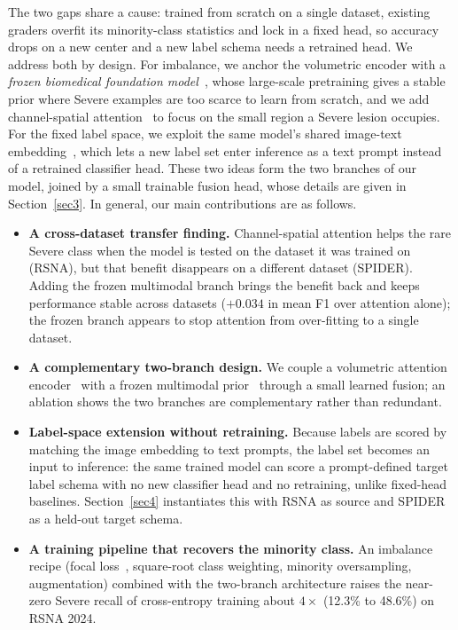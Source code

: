 \documentclass[runningheads]{llncs}
\begin{document}
The two gaps share a cause: trained from scratch on a single dataset, existing graders overfit its minority-class statistics and lock in a fixed head, so accuracy drops on a new center and a new label schema needs a retrained head. We address both by design. For imbalance, we anchor the volumetric encoder with a \emph{frozen biomedical foundation model}~\cite{zhang2023biomedclip}, whose large-scale pretraining gives a stable prior where Severe examples are too scarce to learn from scratch, and we add channel-spatial attention~\cite{woo2018cbam} to focus on the small region a Severe lesion occupies. For the fixed label space, we exploit the same model's shared image-text embedding~\cite{radford2021clip}, which lets a new label set enter inference as a text prompt instead of a retrained classifier head. These two ideas form the two branches of our model, joined by a small trainable fusion head, whose details are given in Section~\ref{sec3}. In general, our main contributions are as follows.
\begin{itemize}
    \item \textbf{A cross-dataset transfer finding.} Channel-spatial attention helps the rare Severe class when the model is tested on the dataset it was trained on (RSNA), but that benefit disappears on a different dataset (SPIDER). Adding the frozen multimodal branch brings the benefit back and keeps performance stable across datasets ($+0.034$ in mean F1 over attention alone); the frozen branch appears to stop attention from over-fitting to a single dataset.
    \item \textbf{A complementary two-branch design.} We couple a volumetric attention encoder~\cite{woo2018cbam} with a frozen multimodal prior~\cite{zhang2023biomedclip} through a small learned fusion; an ablation shows the two branches are complementary rather than redundant.
    \item \textbf{Label-space extension without retraining.} Because labels are scored by matching the image embedding to text prompts, the label set becomes an input to inference: the same trained model can score a prompt-defined target label schema with no new classifier head and no retraining, unlike fixed-head baselines. Section~\ref{sec4} instantiates this with RSNA as source and SPIDER as a held-out target schema.
    \item \textbf{A training pipeline that recovers the minority class.} An imbalance recipe (focal loss~\cite{lin2017focal}, square-root class weighting, minority oversampling, augmentation) combined with the two-branch architecture raises the near-zero Severe recall of cross-entropy training about $4\times$ (12.3\% to 48.6\%) on RSNA 2024.
\end{itemize}
\end{document}
